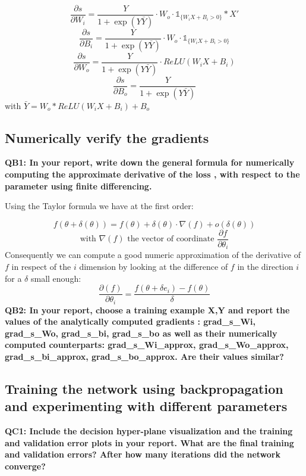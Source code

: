 \documentclass[a4paper,11pt]{exam}
\begin{document}
\[
\frac{\partial s}{\partial W_i} =
	\frac{Y}{1 + \exp(Y\bar{Y})} \cdot W_o \cdot \mathbb 1_{\{W_iX + B_i > 0\}} * X'
\]
\[
\frac{\partial s}{\partial B_i} =
	\frac{Y}{1 + \exp(Y\bar{Y})} \cdot W_o \cdot  \mathbb 1_{\{W_iX + B_i > 0\}}
\]
\[
\frac{\partial s}{\partial W_o} =
	\frac{Y}{1 + \exp(Y\bar{Y})}  \cdot ReLU(W_iX + B_i)
\]
\[
\frac{\partial s}{\partial B_o} =
	\frac{Y}{1 + \exp(Y\bar{Y})}
\]
with $\bar{Y} = W_o * ReLU(W_iX + B_i) + B_o$

\subsection{Numerically verify the gradients}

\textbf{QB1: In your report, write down the general formula for numerically computing the approximate derivative of the loss , with respect to the parameter  using finite differencing.\\}

Using the Taylor formula we have at the first order:

\[
f(\theta + \delta(\theta)) = f(\theta) + \delta(\theta) \cdot \nabla(f) + o(\delta(\theta))
\]
\[
\text{with } \nabla(f) \text{ the vector of coordinate } \frac{\partial f}{\partial \theta_{i}}
\]
Consequently we can compute a good numeric approximation of the derivative of $f$ in respect of the $i$ dimension by looking at the difference of $f$ in the direction $i$ for a $\delta$ small enough:
\[
\frac{\partial(f)}{\partial \theta_{i}} = \frac{f(\theta + \delta e_{i}) - f(\theta) }{\delta}
\]
\textbf{QB2: In your report, choose a training example {X,Y} and report the values of the analytically computed gradients :  grad\_s\_Wi, grad\_s\_Wo, grad\_s\_bi, grad\_s\_bo as well as their numerically computed counterparts: grad\_s\_Wi\_approx, grad\_s\_Wo\_approx, grad\_s\_bi\_approx, grad\_s\_bo\_approx. Are their values similar?\\}

\subsection{Training the network using backpropagation and experimenting with different parameters}

\textbf{QC1: Include the decision hyper-plane visualization and the training and validation error plots in your report. What are the final training and validation errors? After how many iterations did the network converge?\\}
\end{document}
